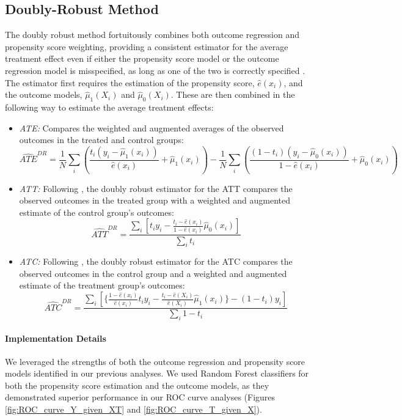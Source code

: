 \documentclass{article}
\newcommand{\gur}[1]{{\color{teal}{Gur: #1}}}
\begin{document}
\subsection{Doubly-Robust Method}

The doubly robust method fortuitously combines both outcome regression and propensity score weighting, providing a consistent estimator for the average treatment effect even if either the propensity score model or the outcome regression model is misspecified, as long as one of the two is correctly specified \citep{bang2005doubly}. The estimator first requires the estimation of the propensity score, $\hat{e}(x_i)$, and the outcome models, $\hat{\mu}_1(X_i)$ and $\hat{\mu}_0(X_i)$. These are then combined in the following way to estimate the average treatment effects:

\gur{Add explanation of augmentation?}

\begin{itemize}
    \item \textit{ATE:} Compares the weighted and augmented averages of the observed outcomes in the treated and control groups:
    \[
    \widehat{ATE}^{DR} = \frac{1}{N} \sum_i \left( \frac{t_i (y_i - \hat{\mu}_1(x_i))}{\hat{e}(x_i)} + \hat{\mu}_1(x_i) \right) - \frac{1}{N} \sum_i \left( \frac{(1 - t_i)(y_i - \hat{\mu}_0(x_i))}{1 - \hat{e}(x_i)} + \hat{\mu}_0(x_i) \right)
    \]
    
    \item \textit{ATT:} Following \citet{tao2019doubly}, the doubly robust estimator for the ATT compares the observed outcomes in the treated group with a weighted and augmented estimate of the control group's outcomes: 
    \[
    \widehat{ATT}^{DR} = \frac{\sum_i \left[ t_i y_i - \frac{ t_i - \hat{e}(x_i)}{1 - \hat{e}(x_i)} \hat{\mu}_0(x_i) \right]}{\sum_i t_i}
    \]
    
    \item \textit{ATC:} Following \citet{tao2019doubly}, the doubly robust estimator for the ATC compares the observed outcomes in the control group and a weighted and augmented estimate of the treatment group's outcomes:
    \[
    \widehat{ATC}^{DR} = \frac{\sum_i \left[ \{ \frac{ 1 - \hat{e}(x_i)}{\hat{e}(x_i)} t_i y_i - \frac{ t_i - \hat{e}(X_i)}{\hat{e}(X_i)} \hat{\mu}_1(x_i) \}   - (1-t_i)y_i \right]}{\sum_i 1 - t_i}
    \]
\end{itemize}

\paragraph{Implementation Details} We leveraged the strengths of both the outcome regression and propensity score models identified in our previous analyses. We used Random Forest classifiers for both the propensity score estimation and the outcome models, as they demonstrated superior performance in our ROC curve analyses (Figures \ref{fig:ROC_curve_Y_given_XT} and \ref{fig:ROC_curve_T_given_X}).
\end{document}
